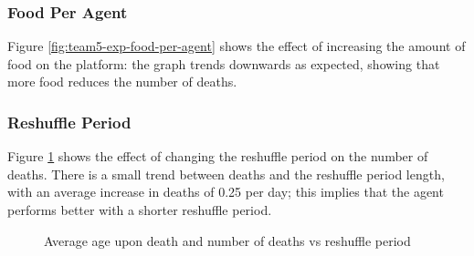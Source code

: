 \subsubsection*{Food Per Agent}
Figure \ref{fig:team5-exp-food-per-agent} shows the effect of increasing the amount of food on the platform: the graph trends downwards as expected, showing that more food reduces the number of deaths.

\subsubsection*{Reshuffle Period}
Figure \ref{fig:team5-exp-reshuffle-period} shows the effect of changing the reshuffle period on the number of deaths. There is a small trend between deaths and the reshuffle period length, with an average increase in deaths of 0.25 per day; this implies that the agent performs better with a shorter reshuffle period.

\begin{figure}
    \centering
    \begin{minipage}{0.6\textwidth}
    \end{minipage}
    \caption{Average age upon death and number of deaths vs reshuffle period}
    \label{fig:team5-exp-reshuffle-period}
\end{figure}


